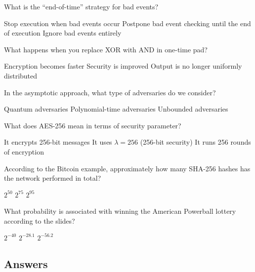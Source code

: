\documentclass[10pt,a4paper,american]{exam}
\begin{document}
\begin{questions}
	\question What is the ``end-of-time'' strategy for bad events?
	\begin{randomizechoices}
		\choice Stop execution when bad events occur
		\CorrectChoice Postpone bad event checking until the end of execution
		\choice Ignore bad events entirely
	\end{randomizechoices}

	\question What happens when you replace XOR with AND in one-time pad?
	\begin{randomizechoices}
		\choice Encryption becomes faster
		\choice Security is improved
		\CorrectChoice Output is no longer uniformly distributed
	\end{randomizechoices}

	\question In the asymptotic approach, what type of adversaries do we consider?
	\begin{randomizechoices}
		\choice Quantum adversaries
		\CorrectChoice Polynomial-time adversaries
		\choice Unbounded adversaries
	\end{randomizechoices}

	\question What does AES-256 mean in terms of security parameter?
	\begin{randomizechoices}
		\choice It encrypts 256-bit messages
		\CorrectChoice It uses $\lambda = 256$ (256-bit security)
		\choice It runs 256 rounds of encryption
	\end{randomizechoices}

	\question According to the Bitcoin example, approximately how many SHA-256 hashes has the network performed in total?
	\begin{randomizechoices}
		\choice $2^{50}$
		\choice $2^{75}$
		\CorrectChoice $2^{95}$
	\end{randomizechoices}

	\question What probability is associated with winning the American Powerball lottery according to the slides?
	\begin{randomizechoices}
		\choice $2^{-40}$
		\CorrectChoice $2^{-28.1}$
		\choice $2^{-56.2}$
	\end{randomizechoices}

\end{questions}

\clearpage

\subsection*{Answers}
\printkeytable
\end{document}
